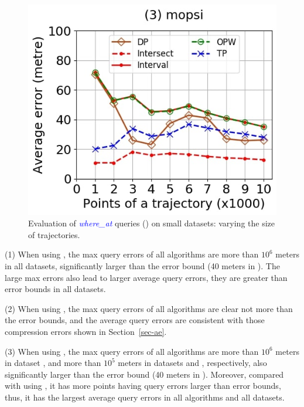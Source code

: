 {\begin{figure}[tb!]
	\includegraphics[scale=0.250]{Figures/Exp-where-DAD-error-size-mopsi.jpg}	
	\vspace{-2ex}
	\caption{\small Evaluation of \textcolor{blue}{\emph{where\_at}} queries (\dad) on small datasets: varying the size of trajectories.}
	\label{fig:query-dad-size}
	\vspace{-1ex}
\end{figure}



\ni (1) When using \ped, the max query errors of all algorithms are more than $10^6$ meters in all datasets, significantly larger than the error bound (40 meters in ). The large max errors also lead to larger average query errors, \ie they are greater than error bounds in all datasets.


\ni (2) When using \sed, the max query errors of all algorithms are clear not more than the error bounds, and the average query errors are consistent with those compression errors shown in Section~\ref{sec-ae}.


\ni (3) When using \dad, the max query errors of all algorithms are more than $10^6$ meters in dataset \ucar, and more than $10^5$ meters in datasets \geolife and \mopsi, respectively, also significantly larger than the error bound (40 meters in ). Moreover, compared with using \ped, it has more points having query errors larger than error bounds, thus, it has the largest average query errors in all algorithms and all datasets.


}
